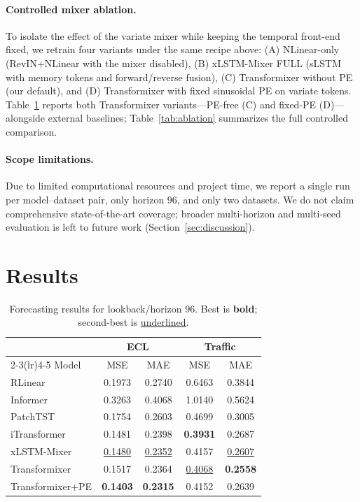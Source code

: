 \documentclass{article}
\begin{document}
\paragraph{Controlled mixer ablation.}
To isolate the effect of the variate mixer while keeping the temporal front-end fixed, we retrain four variants under the same recipe above: (A) NLinear-only (RevIN+NLinear with the mixer disabled), (B) xLSTM-Mixer FULL (sLSTM with memory tokens and forward/reverse fusion), (C) Transformixer without PE (our default), and (D) Transformixer with fixed sinusoidal PE on variate tokens.
Table~\ref{tab:main} reports both Transformixer variants---PE-free (C) and fixed-PE (D)---alongside external baselines; Table~\ref{tab:ablation} summarizes the full controlled comparison.

\paragraph{Scope limitations.}
Due to limited computational resources and project time, we report a single run per model--dataset pair, only horizon $96$, and only two datasets.
We do not claim comprehensive state-of-the-art coverage; broader multi-horizon and multi-seed evaluation is left to future work (Section~\ref{sec:discussion}).

\section{Results}
\label{sec:results}

\begin{table}[t]
  \centering
  \caption{Forecasting results for lookback/horizon $96$. Best is \textbf{bold}; second-best is \underline{underlined}.}
  \label{tab:main}
  \setlength{\tabcolsep}{4pt}
  \begin{tabular}{lcccc}
    \toprule
    & \multicolumn{2}{c}{ECL} & \multicolumn{2}{c}{Traffic} \\
    \cmidrule(lr){2-3}\cmidrule(lr){4-5}
    Model & MSE & MAE & MSE & MAE \\
    \midrule
    RLinear      & 0.1973 & 0.2740 & 0.6463 & 0.3844 \\
    Informer     & 0.3263 & 0.4068 & 1.0140 & 0.5624 \\
    PatchTST     & 0.1754 & 0.2603 & 0.4699 & 0.3005 \\
    iTransformer & 0.1481 & 0.2398 & \textbf{0.3931} & 0.2687 \\
    xLSTM-Mixer  & \underline{0.1480} & \underline{0.2352} & 0.4157 & \underline{0.2607} \\
    Transformixer & 0.1517 & 0.2364 & \underline{0.4068} & \textbf{0.2558} \\
    Transformixer+PE & \textbf{0.1403} & \textbf{0.2315} & 0.4152 & 0.2639 \\
    \bottomrule
  \end{tabular}
\end{table}
\end{document}

